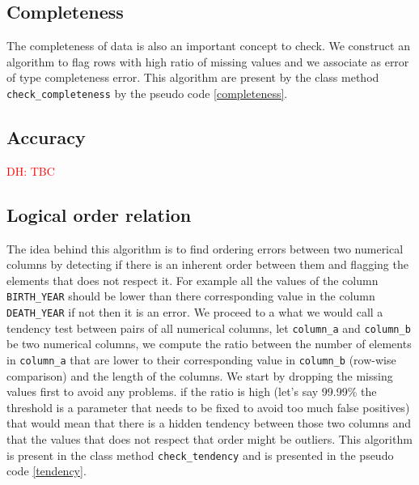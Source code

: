 \documentclass{article}
\newcommand\dhawat[1]{\textcolor{red}{DH: #1}}
\begin{document}
\subsection{Completeness} %
\label{sub:Completeness}
The completeness of data is also an important concept to check. We construct an algorithm to flag rows with high ratio of missing values and we associate as error of type completeness error. This algorithm are present by the class method \texttt{check\_completeness} by the pseudo code \ref{completeness}.


\subsection{Accuracy} %
\label{sub:Accuracy }
\dhawat{TBC}
\subsection{Logical order relation} %
\label{sub:Logical order relation}
The idea behind this algorithm is to find ordering errors between two numerical columns by detecting if there is an inherent order between them and flagging the elements that does not respect it. For example all the values of the column \texttt{BIRTH\_YEAR} should be lower than there corresponding value in the column \texttt{DEATH\_YEAR} if not then it is an error. We proceed to a what we would call a tendency test between pairs of all numerical columns, let \texttt{column\_a} and \texttt{column\_b} be two numerical columns, we compute the ratio between the number of elements in \texttt{column\_a} that are lower to their corresponding value in \texttt{column\_b} (row-wise comparison) and the length of the columns. We start by dropping the missing values first to avoid any problems. if the ratio is high (let's say 99.99\% the threshold is a parameter that needs to be fixed to avoid too much false positives) that would mean that there is a hidden tendency between those two columns and that the values that does not respect that order might be outliers.
This algorithm is present in the class method \texttt{check\_tendency} and is presented in the pseudo code \ref{tendency}.
\end{document}
